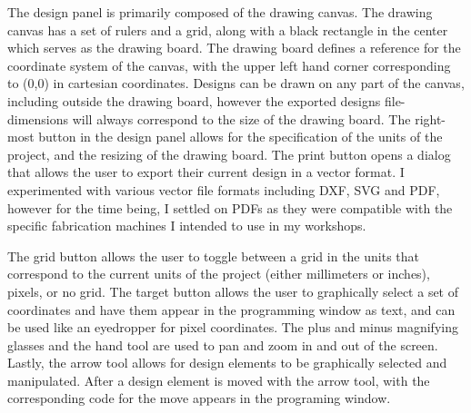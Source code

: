The design panel is primarily composed of the drawing canvas. The drawing canvas has a set of rulers and a grid, along with a black rectangle in the center which serves as the drawing board. The drawing board defines a reference for the coordinate system of the canvas, with the upper left hand corner corresponding to (0,0) in cartesian coordinates. Designs can be drawn on any part of the canvas, including outside the drawing board, however the exported designs file-dimensions will always correspond to the size of the drawing board. The right-most button in the design panel allows for the specification of the units of the project, and the resizing of the drawing board. The print button opens a dialog that allows the user to export their current design in a vector format. I experimented with various vector file formats including DXF, SVG and PDF, however for the time being, I settled on PDFs as they were compatible with the specific fabrication machines I intended to use in my workshops. 

The grid button allows the user to toggle between a grid in the units that correspond to the current units of the project (either millimeters or inches), pixels, or no grid. The target button allows the user to graphically select a set of coordinates and have them appear in the programming window as text, and can be used like an eyedropper for pixel coordinates. The plus and minus magnifying glasses and the hand tool are used to pan and zoom in and out of the screen.  Lastly, the arrow tool allows for design elements to be graphically selected and manipulated. After a design element is moved with the arrow tool, with the corresponding code for the move appears in the programing window. 

